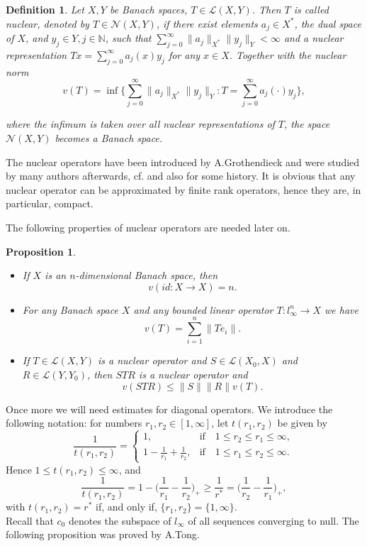 \documentclass[12pt]{article}
\newtheorem{Prop}{Proposition}
\newtheorem{Def}{Definition}
\newcommand{\cn}{{\mathcal N}}
\newcommand{\N}{{\mathbb N}}
\newcommand{\cl}{{\mathcal{L}}}
\begin{document}
\begin{Def}
Let $X,Y$ be Banach spaces, $T\in\cl (X,Y)$. Then $T$ is called nuclear, denoted by  $T\in\cn (X,Y)$, if there exist elements $a_j\in X^*$, the dual space of $X$, and $y_j\in Y, j\in \N$, such that $\sum_{j=0}^{\infty}\|a_j\|_{X^*}\|y_j\|_Y<\infty$ and a nuclear representation $Tx=\sum_{j=0}^{\infty}a_j(x)y_j$ for any $x\in X$. Together with the nuclear norm
$$v(T)=\inf \big\{\sum_{j=0}^{\infty}\|a_j\|_{X^*}\|y_j\|_Y:T=\sum_{j=0}^{\infty}a_j(\cdot)y_j\big\},$$

where the infimum is taken over all nuclear representations of $T$, the space $\cn (X,Y)$ becomes a Banach space.
\end{Def}

The nuclear operators have been introduced by A.Grothendieck \cite{Gr}
and were studied by many authors afterwards, cf. \cite{Pi2,Pi3,Pi} and also \cite{Pi4} for some history. It is obvious that any nuclear operator can be approximated by finite rank operators, hence they are, in particular, compact.

The following properties of nuclear operators are  needed later on.
\begin{Prop}
	\label{Pro1}
\begin{itemize}
	\item[(i)]
If $X$ is an $n$-dimensional Banach space, then
$$
v (id:X\rightarrow X)=n.
$$
\item[(ii)]
For any Banach space $X$ and any bounded linear operator $T:l_\infty^n \rightarrow X$ we have
$$ v(T)=\sum_{i=1}^n\|Te_i\|.$$
\item[(iii)]
If 
$T\in \cl(X,Y)$ is a nuclear operator and $S\in \cl(X_0,X)$ and $R\in \cl(Y,Y_0)$, then $STR$ is a nuclear operator and
$$
v(STR)\leq \|S\|\|R\|v(T).
$$
\end{itemize}
\end{Prop}

Once more we will need estimates for diagonal operators. We introduce the following notation: for numbers $r_1,r_2\in \left[ 1,\infty\right]$, let $t(r_1,r_2)$ be given by
\begin{equation*}
\frac{1}{t(r_1,r_2)}=\begin{cases}
1, &\text{if} \quad 1\leq r_2\leq r_1\leq \infty,\\  
1-\frac{1}{r_1}+\frac{1}{r_2}, &\text{if}\quad  1\leq r_1\leq r_2\leq \infty.  
\end{cases}
\end{equation*}
Hence $1\leq t(r_1,r_2) \leq\infty$, and
$$
\frac{1}{t(r_1,r_2)}=1-\big(\frac{1}{r_1}-\frac{1}{r_2}\big)_+\geq \frac{1}{r^*}=\big(\frac{1}{r_2}-\frac{1}{r_1}\big)_+,
$$
with $t(r_1,r_2)=r^*$ if, and only if, $\{r_1,r_2\}=\{1,\infty\}$.\\
Recall that $c_0$ denotes the subspace of $l_\infty$ of all sequences converging to null. The following proposition was proved by A.Tong. 
\end{document}
